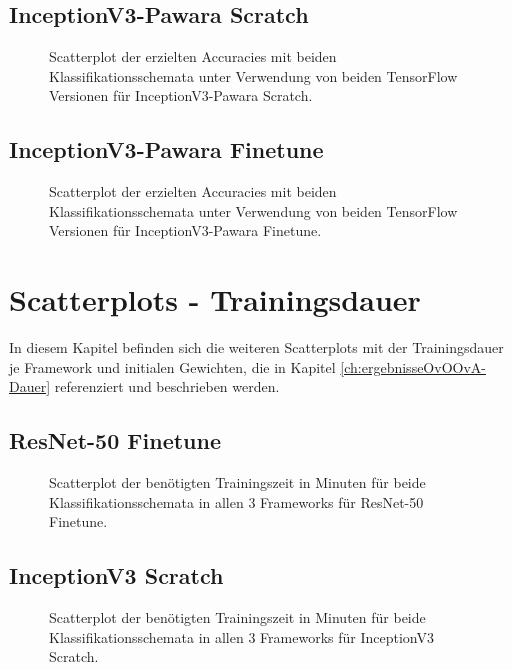 \section{InceptionV3-Pawara Scratch}
\begin{figure}[H]
\hspace*{-1.5cm}

\caption{Scatterplot der erzielten Accuracies mit beiden Klassifikationsschemata unter Verwendung von beiden TensorFlow \cite{tensorflow} Versionen für InceptionV3-Pawara Scratch.}
\label{fig:ScatterplotIPS}
\end{figure}%
\newpage%
\section{InceptionV3-Pawara Finetune}
\begin{figure}[H]
\hspace*{-1.5cm}

\caption{Scatterplot der erzielten Accuracies mit beiden Klassifikationsschemata unter Verwendung von beiden TensorFlow \cite{tensorflow} Versionen für InceptionV3-Pawara Finetune.}
\label{fig:ScatterplotIPF}
\end{figure}%
\newpage
\vspace*{-1cm}
\chapter{Scatterplots - Trainingsdauer}
\label{ch:Anhang_ScatterplotsDauer}
\vspace*{-0.5cm}
In diesem Kapitel befinden sich die weiteren Scatterplots mit der Trainingsdauer je Framework und initialen Gewichten, die in Kapitel \ref{ch:ergebnisseOvOOvA-Dauer} referenziert und beschrieben werden.
\section{ResNet-50 Finetune}
\vspace*{-0.8cm}
\begin{figure}[H]
\hspace*{-1.5cm}

\vspace*{-2.5cm}
\caption{Scatterplot der benötigten Trainingszeit in Minuten für beide Klassifikationsschemata in allen 3 Frameworks für ResNet-50 Finetune.}
\label{fig:ScatterplotRF-dauer}
\end{figure}%
\newpage%
\section{InceptionV3 Scratch}
\begin{figure}[H]
\hspace*{-1.5cm}

\caption{Scatterplot der benötigten Trainingszeit in Minuten für beide Klassifikationsschemata in allen 3 Frameworks für InceptionV3 Scratch.}
\label{fig:ScatterplotIS-dauer}
\end{figure}%
\newpage%
